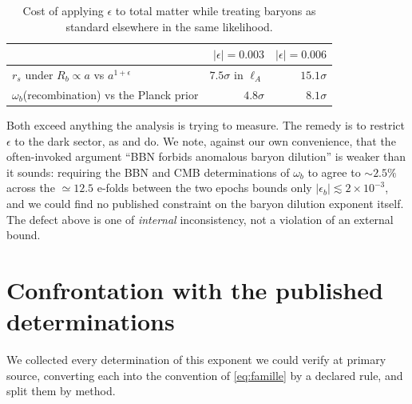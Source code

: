 \documentclass[11pt,a4paper]{article}
\begin{document}
\begin{table}[h]
\centering
\begin{tabular}{lrr}
\toprule
 & $|\epsilon|=0.003$ & $|\epsilon|=0.006$ \\
\midrule
$r_s$ under $R_b\propto a$ vs $a^{1+\epsilon}$ & $7.5\sigma$ in $\ell_A$ & $15.1\sigma$ \\
$\omega_b$(recombination) vs the Planck prior & $4.8\sigma$ & $8.1\sigma$ \\
\bottomrule
\end{tabular}
\caption{Cost of applying $\epsilon$ to total matter while treating baryons as standard
elsewhere in the same likelihood.}
\label{tab:baryons}
\end{table}

Both exceed anything the analysis is trying to measure. The remedy is to restrict $\epsilon$
to the dark sector, as \citet{kumar2025} and \citet{yaoliu2025} do. We note, against our own
convenience, that the often-invoked argument ``BBN forbids anomalous baryon dilution'' is
weaker than it sounds: requiring the BBN and CMB determinations of $\omega_b$ to agree to
$\sim2.5\%$ across the $\simeq12.5$ e-folds between the two epochs bounds only
$|\epsilon_b|\lesssim2\times10^{-3}$, and we could find no published constraint on the baryon
dilution exponent itself. The defect above is one of \emph{internal} inconsistency, not a
violation of an external bound.

\section{Confrontation with the published determinations}
\label{sec:litterature}

We collected every determination of this exponent we could verify at primary source,
converting each into the convention of \eqref{eq:famille} by a declared rule, and split them
by method.
\end{document}
